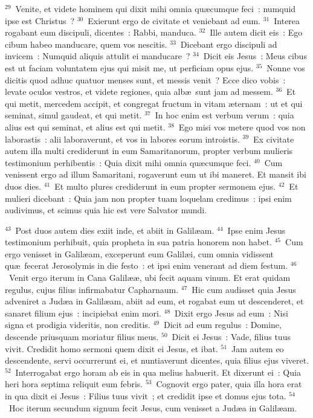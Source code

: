 ${}^{29}$~Venite, et videte hominem qui dixit mihi omnia qu\ae cumque feci~: numquid ipse est Christus~?
${}^{30}$~Exierunt ergo de civitate et veniebant ad eum.
${}^{31}$~Interea rogabant eum discipuli, dicentes~: Rabbi, manduca.
${}^{32}$~Ille autem dicit eis~: Ego cibum habeo manducare, quem vos nescitis.
${}^{33}$~Dicebant ergo discipuli ad invicem~: Numquid aliquis attulit ei manducare~?
${}^{34}$~Dicit eis Jesus~: Meus cibus est ut faciam voluntatem ejus qui misit me, ut perficiam opus ejus.
${}^{35}$~Nonne vos dicitis quod adhuc quatuor menses sunt, et messis venit~? Ecce dico vobis~: levate oculos vestros, et videte regiones, quia alb\ae\ sunt jam ad messem.
${}^{36}$~Et qui metit, mercedem accipit, et congregat fructum in vitam \ae ternam~: ut et qui seminat, simul gaudeat, et qui metit.
${}^{37}$~In hoc enim est verbum verum~: quia alius est qui seminat, et alius est qui metit.
${}^{38}$~Ego misi vos metere quod vos non laborastis~: alii laboraverunt, et vos in labores eorum introistis.
${}^{39}$~Ex civitate autem illa multi crediderunt in eum Samaritanorum, propter verbum mulieris testimonium perhibentis~: Quia dixit mihi omnia qu\ae cumque feci.
${}^{40}$~Cum venissent ergo ad illum Samaritani, rogaverunt eum ut ibi maneret. Et mansit ibi duos dies.
${}^{41}$~Et multo plures crediderunt in eum propter sermonem ejus.
${}^{42}$~Et mulieri dicebant~: Quia jam non propter tuam loquelam credimus~: ipsi enim audivimus, et scimus quia hic est vere Salvator mundi.


${}^{43}$~Post duos autem dies exiit inde, et abiit in Galil\ae am.
${}^{44}$~Ipse enim Jesus testimonium perhibuit, quia propheta in sua patria honorem non habet.
${}^{45}$~Cum ergo venisset in Galil\ae am, exceperunt eum Galil\ae i, cum omnia vidissent qu\ae\ fecerat Jerosolymis in die festo~: et ipsi enim venerant ad diem festum.
${}^{46}$~Venit ergo iterum in Cana Galil\ae \ae , ubi fecit aquam vinum. Et erat quidam regulus, cujus filius infirmabatur Capharnaum.
${}^{47}$~Hic cum audisset quia Jesus adveniret a Jud\ae a in Galil\ae am, abiit ad eum, et rogabat eum ut descenderet, et sanaret filium ejus~: incipiebat enim mori.
${}^{48}$~Dixit ergo Jesus ad eum~: Nisi signa et prodigia videritis, non creditis.
${}^{49}$~Dicit ad eum regulus~: Domine, descende priusquam moriatur filius meus.
${}^{50}$~Dicit ei Jesus~: Vade, filius tuus vivit. Credidit homo sermoni quem dixit ei Jesus, et ibat.
${}^{51}$~Jam autem eo descendente, servi occurrerunt ei, et nuntiaverunt dicentes, quia filius ejus viveret.
${}^{52}$~Interrogabat ergo horam ab eis in qua melius habuerit. Et dixerunt ei~: Quia heri hora septima reliquit eum febris.
${}^{53}$~Cognovit ergo pater, quia illa hora erat in qua dixit ei Jesus~: Filius tuus vivit~; et credidit ipse et domus ejus tota.
${}^{54}$~Hoc iterum secundum signum fecit Jesus, cum venisset a Jud\ae a in Galil\ae am.

